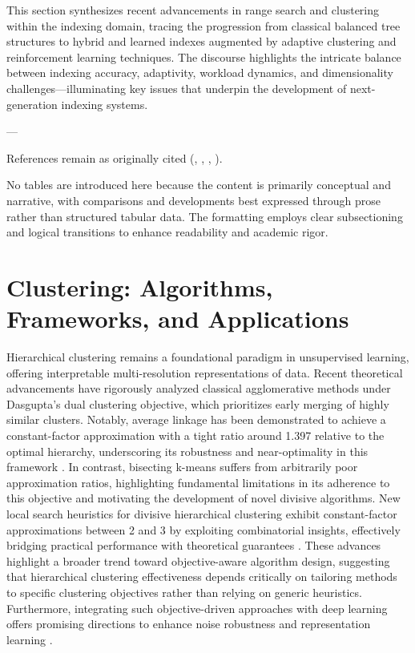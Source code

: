 \documentclass[11pt]{article}
\begin{document}
\bigskip

This section synthesizes recent advancements in range search and clustering within the indexing domain, tracing the progression from classical balanced tree structures to hybrid and learned indexes augmented by adaptive clustering and reinforcement learning techniques. The discourse highlights the intricate balance between indexing accuracy, adaptivity, workload dynamics, and dimensionality challenges—illuminating key issues that underpin the development of next-generation indexing systems.

---

References remain as originally cited (\cite{ref31}, \cite{ref33}, \cite{ref34}, \cite{ref35}).

No tables are introduced here because the content is primarily conceptual and narrative, with comparisons and developments best expressed through prose rather than structured tabular data. The formatting employs clear subsectioning and logical transitions to enhance readability and academic rigor.

\section{Clustering: Algorithms, Frameworks, and Applications}

Hierarchical clustering remains a foundational paradigm in unsupervised learning, offering interpretable multi-resolution representations of data. Recent theoretical advancements have rigorously analyzed classical agglomerative methods under Dasgupta’s dual clustering objective, which prioritizes early merging of highly similar clusters. Notably, average linkage has been demonstrated to achieve a constant-factor approximation with a tight ratio around 1.397 relative to the optimal hierarchy, underscoring its robustness and near-optimality in this framework \cite{ref12}. In contrast, bisecting k-means suffers from arbitrarily poor approximation ratios, highlighting fundamental limitations in its adherence to this objective and motivating the development of novel divisive algorithms. New local search heuristics for divisive hierarchical clustering exhibit constant-factor approximations between 2 and 3 by exploiting combinatorial insights, effectively bridging practical performance with theoretical guarantees \cite{ref12}. These advances highlight a broader trend toward objective-aware algorithm design, suggesting that hierarchical clustering effectiveness depends critically on tailoring methods to specific clustering objectives rather than relying on generic heuristics. Furthermore, integrating such objective-driven approaches with deep learning offers promising directions to enhance noise robustness and representation learning \cite{ref12}.
\end{document}
